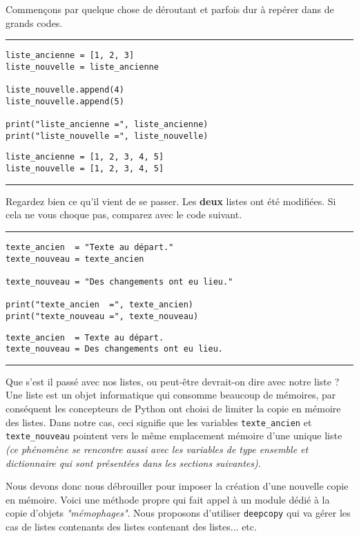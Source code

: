 Commençons par quelque chose de déroutant et parfois dur à repérer dans de grands codes.


\bigskip
{\hrule height .5mm}
\begin{verbatim}
liste_ancienne = [1, 2, 3]
liste_nouvelle = liste_ancienne

liste_nouvelle.append(4)
liste_nouvelle.append(5)

print("liste_ancienne =", liste_ancienne)
print("liste_nouvelle =", liste_nouvelle)
\end{verbatim}
 \color{ForestGreen}
\vspace{-1.5em}
\begin{verbatim}
liste_ancienne = [1, 2, 3, 4, 5]
liste_nouvelle = [1, 2, 3, 4, 5]
\end{verbatim} \color{Black}
{\hrule height .5mm}
\bigskip


Regardez bien ce qu'il vient de se passer. Les \textbf{deux} listes ont été modifiées. Si cela ne vous choque pas, comparez avec le code suivant.


\bigskip
{\hrule height .5mm}
\begin{verbatim}
texte_ancien  = "Texte au départ."
texte_nouveau = texte_ancien

texte_nouveau = "Des changements ont eu lieu."

print("texte_ancien  =", texte_ancien)
print("texte_nouveau =", texte_nouveau)
\end{verbatim}
 \color{ForestGreen}
\vspace{-1.5em}
\begin{verbatim}
texte_ancien  = Texte au départ.
texte_nouveau = Des changements ont eu lieu.
\end{verbatim} \color{Black}
{\hrule height .5mm}
\bigskip


Que s'est il passé avec nos listes, ou peut-être devrait-on dire avec notre liste ? Une liste est un objet informatique qui consomme beaucoup de mémoires, par conséquent les concepteurs de Python ont choisi de limiter la copie en mémoire des listes. Dans notre cas, ceci signifie que les variables \texttt{texte\_ancien} et \texttt{texte\_nouveau} pointent vers le même emplacement mémoire d'une unique liste \textit{(ce phénomène se rencontre aussi avec les variables de type ensemble et dictionnaire qui sont présentées dans les sections suivantes)}.

Nous devons donc nous débrouiller pour imposer la création d'une nouvelle copie en mémoire. Voici une méthode propre qui fait appel à un module dédié à la copie d'objets \textit{"mémophages"}. Nous proposons d'utiliser \texttt{deepcopy} qui va gérer les cas de listes contenants des listes contenant des listes... etc.



